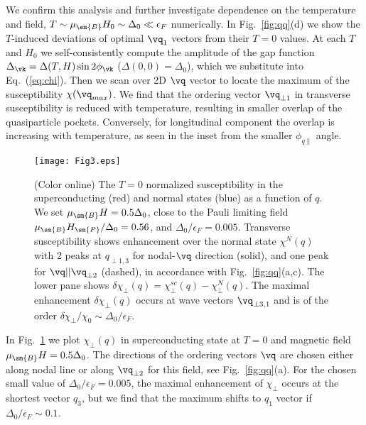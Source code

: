 \documentclass[aps,prl,twocolumn,showpacs,amsmath,amssymb]{revtex4-1}
\begin{document}
We confirm this analysis 
and further investigate dependence on the temperature and field, 
$T \sim \mu_\sm{B}H_0 \sim \Delta_0 \ll \epsilon_F$ 
numerically. 
In Fig.~\ref{fig:qq}(d) 
we show the $T$-induced deviations of optimal $\vq_1$ vectors from their $T=0$ values.
At each $T$ and $H_0$ we 
self-consistently compute the amplitude of the gap function $\Delta_\vk = \Delta(T,H) \sin 2\phi_\vk$ 
($\Delta(0,0) = \Delta_0$), which we substitute into Eq.~(\ref{eq:chi}). 
Then we scan over 2D $\vq$ vector to locate  
the maximum of the susceptibility $\chi(\vq_{max})$. 
We find that the ordering vector $\vq_{\perp 1}$ in transverse susceptibility is 
reduced with temperature, resulting in smaller overlap of the quasiparticle pockets.
Conversely, for longitudinal component the overlap is increasing with temperature, as 
seen in the inset from the smaller $\phi_{q\parallel}$ angle.  

\begin{figure}[t]
\texttt{[image: Fig3.eps]}
\caption{
	\label{fig:chi_enh}
(Color online)
The $T=0$ normalized susceptibility in the superconducting (red) and normal
states (blue) as a function of $q$. 
We set $\mu_\sm{B} H = 0.5\Delta_0$, close to
the Pauli limiting field $\mu_\sm{B} H_\sm{P}/\Delta_0 = 0.56$, 
and $\Delta_0/\epsilon_F = 0.005$. 
Transverse susceptibility shows enhancement over the normal state $\chi^N(q)$
with 2 peaks at $q_{\perp 1,3}$ for nodal-$\vq$ direction (solid), 
and one peak for $\vq || \vq_{\perp 2}$ (dashed), in accordance with Fig.~\ref{fig:qq}(a,c). 
The lower pane shows $\delta\chi_\perp(q) = \chi_\perp^{sc}(q) - \chi_\perp^{N}(q)$. 
The maximal enhancement $\delta \chi_{\perp}(q)$ occurs at wave vectors 
$\vq_{\perp 3,1}$ and is of the 
order $\delta \chi_\perp/\chi_0 \sim \Delta_0/\epsilon_F$. 
}
 \end{figure}
  

In Fig.~\ref{fig:chi_enh} we plot $\chi_\perp(q)$ 
in superconducting state at $T=0$ and magnetic field $\mu_\sm{B} H = 0.5\Delta_0$. 
The directions of the ordering vectors $\vq$ are chosen either along nodal line or along 
$\vq_{\perp 2}$ for this field, see Fig.~\ref{fig:qq}(a).
For the chosen small value of $\Delta_0/\epsilon_F = 0.005$, 
the maximal enhancement of $\chi_\perp$ occurs at the shortest vector $q_3$, 
but we find that the maximum shifts to $q_1$ vector if $\Delta_0/\epsilon_F\sim 0.1$. 
\end{document}
